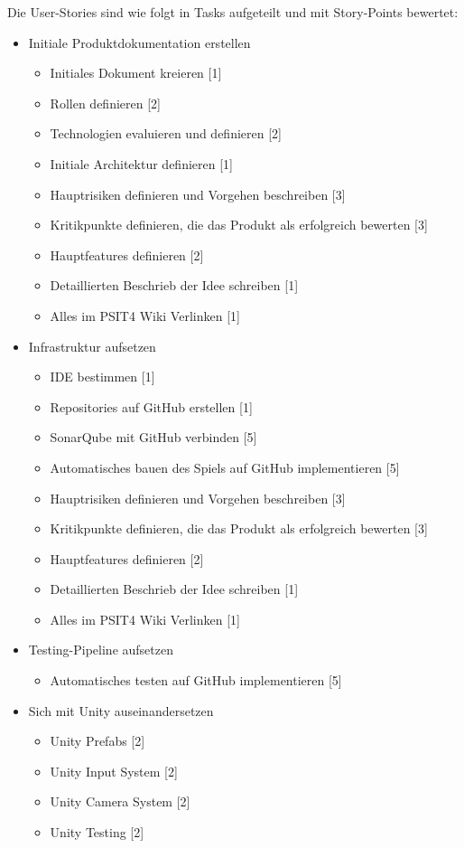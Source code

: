 \documentclass[../main.tex]{subfiles}
\begin{document}
	\par Die User-Stories sind wie folgt in Tasks aufgeteilt und mit Story-Points bewertet:
	
	\begin{itemize}
		\item Initiale Produktdokumentation erstellen
		\begin{itemize}
			\item Initiales Dokument kreieren [1]
			\item Rollen definieren [2]
			\item Technologien evaluieren und definieren [2]
			\item Initiale Architektur definieren [1]
			\item Hauptrisiken definieren und Vorgehen beschreiben [3]
			\item Kritikpunkte definieren, die das Produkt als erfolgreich bewerten [3]
			\item Hauptfeatures definieren [2]
			\item Detaillierten Beschrieb der Idee schreiben [1]
			\item Alles im PSIT4 Wiki Verlinken [1]
		\end{itemize} 
		\item Infrastruktur aufsetzen
		\begin{itemize}
			\item IDE bestimmen [1]
			\item Repositories auf GitHub erstellen [1]
			\item SonarQube mit GitHub verbinden [5]
			\item Automatisches bauen des Spiels auf GitHub implementieren [5]
			\item Hauptrisiken definieren und Vorgehen beschreiben [3]
			\item Kritikpunkte definieren, die das Produkt als erfolgreich bewerten [3]
			\item Hauptfeatures definieren [2]
			\item Detaillierten Beschrieb der Idee schreiben [1]
			\item Alles im PSIT4 Wiki Verlinken [1]
		\end{itemize} 
		\item Testing-Pipeline aufsetzen
		\begin{itemize}
			\item Automatisches testen auf GitHub implementieren [5]
		\end{itemize}
		\item Sich mit Unity auseinandersetzen
		\begin{itemize}
			\item Unity Prefabs [2]
			\item Unity Input System [2]
			\item Unity Camera System [2]
			\item Unity Testing [2]
		\end{itemize}
	\end{itemize} 
\end{document}
